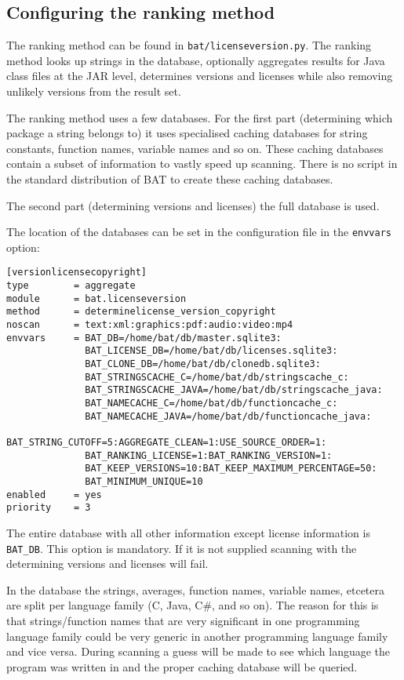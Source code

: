 \documentclass[10pt]{article}
\begin{document}
\subsection{Configuring the ranking method}

The ranking method can be found in \texttt{bat/licenseversion.py}. The ranking
method looks up strings in the database, optionally aggregates results for
Java class files at the JAR level, determines versions and licenses while also
removing unlikely versions from the result set.

The ranking method uses a few databases. For the first part (determining which
package a string belongs to) it uses specialised caching databases for string
constants, function names, variable names and so on. These caching databases
contain a subset of information to vastly speed up scanning. There is no script
in the standard distribution of BAT to create these caching databases.

The second part (determining versions and licenses) the full database is used.

The location of the databases can be set in the configuration file in
the \texttt{envvars} option:

\begin{verbatim}
[versionlicensecopyright]
type        = aggregate
module      = bat.licenseversion
method      = determinelicense_version_copyright
noscan      = text:xml:graphics:pdf:audio:video:mp4
envvars     = BAT_DB=/home/bat/db/master.sqlite3:
              BAT_LICENSE_DB=/home/bat/db/licenses.sqlite3:
              BAT_CLONE_DB=/home/bat/db/clonedb.sqlite3:
              BAT_STRINGSCACHE_C=/home/bat/db/stringscache_c:
              BAT_STRINGSCACHE_JAVA=/home/bat/db/stringscache_java:
              BAT_NAMECACHE_C=/home/bat/db/functioncache_c:
              BAT_NAMECACHE_JAVA=/home/bat/db/functioncache_java:
              BAT_STRING_CUTOFF=5:AGGREGATE_CLEAN=1:USE_SOURCE_ORDER=1:
              BAT_RANKING_LICENSE=1:BAT_RANKING_VERSION=1:
              BAT_KEEP_VERSIONS=10:BAT_KEEP_MAXIMUM_PERCENTAGE=50:
              BAT_MINIMUM_UNIQUE=10
enabled     = yes
priority    = 3
\end{verbatim}

The entire database with all other information except license information is
\texttt{BAT\_DB}. This option is mandatory. If it is not supplied scanning with
the determining versions and licenses will fail.

In the database the strings, averages, function names, variable names, etcetera
are split per language family (C, Java, C\#, and so on). The reason for this is
that strings/function names that are very significant in one programming
language family could be very generic in another programming language family
and vice versa. During scanning a guess will be made to see which language the
program was written in and the proper caching database will be queried.
\end{document}
